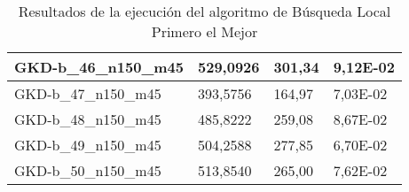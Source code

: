 \begin{table}[!ht]
\begin{adjustbox}{height=12cm}
\begin{tabular}{|l|l|l|l|}
        GKD-b\_46\_n150\_m45 & 529,0926 & 301,34 & 9,12E-02 \\ \hline
        GKD-b\_47\_n150\_m45 & 393,5756 & 164,97 & 7,03E-02 \\ \hline
        GKD-b\_48\_n150\_m45 & 485,8222 & 259,08 & 8,67E-02 \\ \hline
        GKD-b\_49\_n150\_m45 & 504,2588 & 277,85 & 6,70E-02 \\ \hline
        GKD-b\_50\_n150\_m45 & 513,8540 & 265,00 & 7,62E-02 \\ \hline
    \end{tabular}
    \end{adjustbox}
    \caption{Resultados de la ejecución del algoritmo de Búsqueda Local Primero el Mejor}
\end{table}

\pagebreak